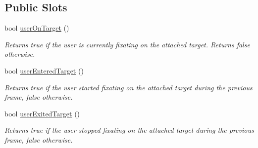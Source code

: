 \subsection*{Public Slots}
\begin{DoxyCompactItemize}
\item 
\hypertarget{class_picto_1_1_target_controller_ac358ce65a6a2f1bbf7f938e6e631f4e6}{bool \hyperlink{class_picto_1_1_target_controller_ac358ce65a6a2f1bbf7f938e6e631f4e6}{user\-On\-Target} ()}\label{class_picto_1_1_target_controller_ac358ce65a6a2f1bbf7f938e6e631f4e6}

\begin{DoxyCompactList}\small\item\em Returns true if the user is currently fixating on the attached target. Returns false otherwise. \end{DoxyCompactList}\item 
\hypertarget{class_picto_1_1_target_controller_a98fefb89300742e886d72a6220635673}{bool \hyperlink{class_picto_1_1_target_controller_a98fefb89300742e886d72a6220635673}{user\-Entered\-Target} ()}\label{class_picto_1_1_target_controller_a98fefb89300742e886d72a6220635673}

\begin{DoxyCompactList}\small\item\em Returns true if the user started fixating on the attached target during the previous frame, false otherwise. \end{DoxyCompactList}\item 
\hypertarget{class_picto_1_1_target_controller_a2ba45d174138618ae642b91c1886807a}{bool \hyperlink{class_picto_1_1_target_controller_a2ba45d174138618ae642b91c1886807a}{user\-Exited\-Target} ()}\label{class_picto_1_1_target_controller_a2ba45d174138618ae642b91c1886807a}

\begin{DoxyCompactList}\small\item\em Returns true if the user stopped fixating on the attached target during the previous frame, false otherwise. \end{DoxyCompactList}\end{DoxyCompactItemize}
